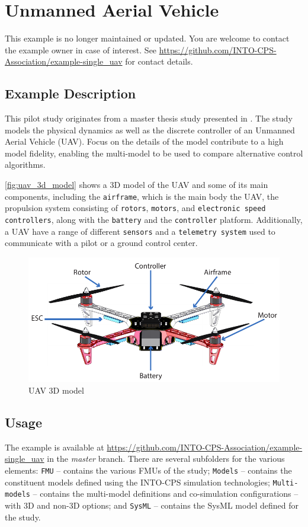 \section{Unmanned Aerial Vehicle}
\label{sec:uavsingle}
This example is no longer maintained or updated. You are welcome to contact the example owner in case of interest.
See \url{https://github.com/INTO-CPS-Association/example-single_uav} for contact details.

	\subsection{Example Description}
	\label{sec:uavsingle_desc}
		This pilot study originates from a master thesis study presented in \cite{Grujic&16}.
		The study models the physical dynamics as well as the discrete controller of an Unmanned Aerial Vehicle (UAV).
		Focus on the details of the model contribute to a high model fidelity, enabling the multi-model to be used to compare alternative control algorithms.

		\autoref{fig:uav_3d_model} shows a 3D model of the UAV and some of its main components, including the \texttt{airframe}, which is the main body the UAV, the propulsion system consisting of \texttt{rotors}, \texttt{motors}, and \texttt{electronic speed controllers}, along with the \texttt{battery} and the \texttt{controller} platform.
		Additionally, a UAV have a range of different \texttt{sensors} and a \texttt{telemetry system} used to communicate with a pilot or a ground control center.

		\begin{figure}[htbp]
			\centering
			\includegraphics[width=0.7\linewidth]{uavsingle/drone.pdf}
			\caption{UAV 3D model}
			\label{fig:uav_3d_model}
		\end{figure}

	\subsection{Usage}
	\label{sec:uavsingle_usage}
		The example is available at \url{https://github.com/INTO-CPS-Association/example-single_uav} in the \emph{master} branch. There are several subfolders for the various elements: \texttt{FMU} -- contains the various FMUs of the study; \texttt{Models} -- contains the constituent models defined using the INTO-CPS simulation technologies; \texttt{Multi-models} -- contains the multi-model definitions and co-simulation configurations -- with 3D and non-3D options; and \texttt{SysML} -- contains the SysML model defined for the study.

